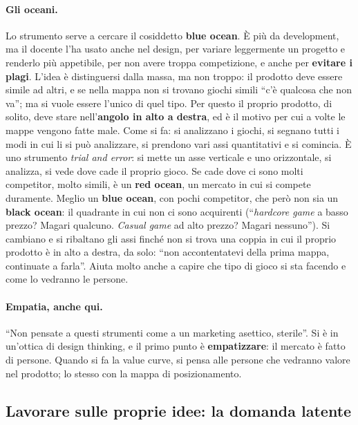 \paragraph{Gli oceani.} Lo strumento serve a cercare il cosiddetto \textbf{blue ocean}.
È più da development, ma il docente l'ha usato anche nel design, per variare leggermente
un progetto e renderlo più appetibile, per non avere troppa competizione, e anche per
\textbf{evitare i plagi}. L'idea è distinguersi dalla massa, ma non troppo: il prodotto
deve essere simile ad altri, e se nella mappa non si trovano giochi simili ``c'è qualcosa
che non va''; ma si vuole essere l'unico di quel tipo. Per questo il proprio prodotto, di
solito, deve stare nell'\textbf{angolo in alto a destra}, ed è il motivo per cui a volte
le mappe vengono fatte male. Come si fa: si analizzano i giochi, si segnano tutti i modi
in cui li si può analizzare, si prendono vari assi quantitativi e si comincia. È uno
strumento \emph{trial and error}: si mette un asse verticale e uno orizzontale, si
analizza, si vede dove cade il proprio gioco. Se cade dove ci sono molti competitor, molto
simili, è un \textbf{red ocean}, un mercato in cui si compete duramente. Meglio un
\textbf{blue ocean}, con pochi competitor, che però non sia un \textbf{black ocean}: il
quadrante in cui non ci sono acquirenti (``\emph{hardcore game} a basso prezzo? Magari
qualcuno. \emph{Casual game} ad alto prezzo? Magari nessuno''). Si cambiano e si ribaltano
gli assi finché non si trova una coppia in cui il proprio prodotto è in alto a destra,
da solo: ``non accontentatevi della prima mappa, continuate a farla''. Aiuta molto anche a
capire che tipo di gioco si sta facendo e come lo vedranno le persone.

\paragraph{Empatia, anche qui.} ``Non pensate a questi strumenti come a un marketing
asettico, sterile''. Si è in un'ottica di design thinking, e il primo punto è
\textbf{empatizzare}: il mercato è fatto di persone. Quando si fa la value curve, si pensa
alle persone che vedranno valore nel prodotto; lo stesso con la mappa di posizionamento.

\subsection{Lavorare sulle proprie idee: la domanda latente}



